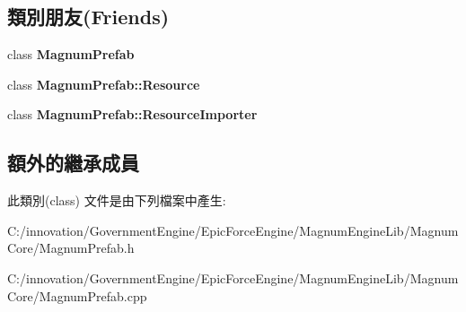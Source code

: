 \subsection*{類別朋友(Friends)}
\begin{DoxyCompactItemize}
\item 
class {\bfseries Magnum\+Prefab}\hypertarget{class_i_dream_sky_1_1_magnum_prefab_1_1_resource_af673f35827b6a2ca5306beed6f132f97}{}\label{class_i_dream_sky_1_1_magnum_prefab_1_1_resource_af673f35827b6a2ca5306beed6f132f97}

\item 
class {\bfseries Magnum\+Prefab\+::\+Resource}\hypertarget{class_i_dream_sky_1_1_magnum_prefab_1_1_resource_a96406f0ce756fc948a514e9f70ce0305}{}\label{class_i_dream_sky_1_1_magnum_prefab_1_1_resource_a96406f0ce756fc948a514e9f70ce0305}

\item 
class {\bfseries Magnum\+Prefab\+::\+Resource\+Importer}\hypertarget{class_i_dream_sky_1_1_magnum_prefab_1_1_resource_a4eb47515c2ca88e47be1dcbb51810ba6}{}\label{class_i_dream_sky_1_1_magnum_prefab_1_1_resource_a4eb47515c2ca88e47be1dcbb51810ba6}

\end{DoxyCompactItemize}
\subsection*{額外的繼承成員}


此類別(class) 文件是由下列檔案中產生\+:\begin{DoxyCompactItemize}
\item 
C\+:/innovation/\+Government\+Engine/\+Epic\+Force\+Engine/\+Magnum\+Engine\+Lib/\+Magnum\+Core/Magnum\+Prefab.\+h\item 
C\+:/innovation/\+Government\+Engine/\+Epic\+Force\+Engine/\+Magnum\+Engine\+Lib/\+Magnum\+Core/Magnum\+Prefab.\+cpp\end{DoxyCompactItemize}
